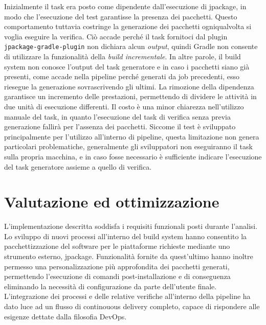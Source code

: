 Inizialmente il task era posto come dipendente dall'esecuzione di jpackage, in modo che l'esecuzione del test garantisse la presenza dei pacchetti. Questo comportamento tuttavia costringe la generazione dei pacchetti ogniqualvolta si voglia eseguire la verifica. Ciò accade perché il task fornitoci dal plugin \texttt{jpackage-gradle-plugin} non dichiara alcun \textit{output}, quindi Gradle non consente di utilizzare la funzionalità della \textit{build incrementale}. In altre parole, il build system non conosce l'output del task generatore e in caso i pacchetti siano già presenti, come accade nella pipeline perché generati da job precedenti, esso riesegue la generazione sovrascrivendo gli ultimi. La rimozione della dipendenza garantisce un incremento delle prestazioni, permettendo di dividere le attività in due unità di esecuzione differenti. Il costo è una minor chiarezza nell'utilizzo manuale del task, in quanto l'esecuzione del task di verifica senza previa generazione fallirà per l'assenza dei pacchetti. Siccome il test è sviluppato principalmente per l'utilizzo all'interno di pipeline, questa limitazione non genera particolari problematiche, generalmente gli sviluppatori non eseguiranno il task sulla propria macchina, e in caso fosse necessario è sufficiente indicare l'esecuzione del task generatore assieme a quello di verifica.

\section{Valutazione ed ottimizzazione}

L'implementazione descritta soddisfa i requisiti funzionali posti durante l'analisi. Lo sviluppo di nuovi processi all'interno del build system hanno consentito la pacchettizzazione del software per le piattaforme richieste mediante uno strumento esterno, jpackage. Funzionalità fornite da quest'ultimo hanno inoltre permesso una personalizzazione più approfondita dei pacchetti generati, permettendo l'esecuzione di comandi post-installazione e di conseguenza eliminando la necessità di configurazione da parte dell'utente finale. L'integrazione dei processi e delle relative verifiche all'interno della pipeline ha dato luce ad un flusso di continouous delivery completo, capace di rispondere alle esigenze dettate dalla filosofia DevOps.

